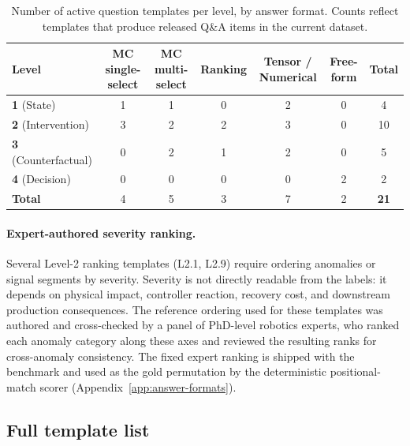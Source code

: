 \begin{table}[htbp]
    \centering
    \caption{Number of active question templates per level, by answer format. Counts reflect templates that produce released Q\&A items in the current dataset.}
    \label{tab:template_inventory}
    \small
    \begin{tabular}{@{}lcccccc@{}}
        \toprule
        Level                       & MC single-select & MC multi-select & Ranking & Tensor / Numerical & Free-form & Total       \\
        \midrule
        \textbf{1} (State)          & 1                & 1               & 0       & 2                  & 0         & 4           \\
        \textbf{2} (Intervention)   & 3                & 2               & 2       & 3                  & 0         & 10          \\
        \textbf{3} (Counterfactual) & 0                & 2               & 1       & 2                  & 0         & 5           \\
        \textbf{4} (Decision)       & 0                & 0               & 0       & 0                  & 2         & 2           \\
        \midrule
        \textbf{Total}              & 4                & 5               & 3       & 7                  & 2         & \textbf{21} \\
        \bottomrule
    \end{tabular}
\end{table}



\paragraph{Expert-authored severity ranking.}
Several Level-2 ranking templates (L2.1, L2.9) require ordering anomalies or signal segments by severity. Severity is not directly readable from the labels: it depends on physical impact, controller reaction, recovery cost, and downstream production consequences. The reference ordering used for these templates was authored and cross-checked by a panel of PhD-level robotics experts, who ranked each anomaly category along these axes and reviewed the resulting ranks for cross-anomaly consistency. The fixed expert ranking is shipped with the benchmark and used as the gold permutation by the deterministic positional-match scorer (Appendix~\ref{app:answer-formats}).

\subsection{Full template list}
\label{app:template_list}


